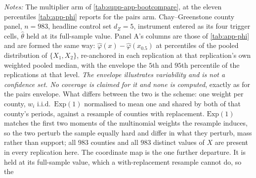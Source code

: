\documentclass[
  12pt]{article}
\newcommand{\1}[1]{\mathds{1}\left[#1\right]}
\theoremstyle{plain}
\theoremstyle{definition}
\theoremstyle{definition}
\theoremstyle{remark}
\begin{document}
\begin{landscape}
\begingroup
\singlespacing
{}
\label{tab:supp-app-phimult}
\scriptsize
\setlength{\tabcolsep}{4pt}
\let\tabular\longtable
\let\endtabular\endlongtable

\addtocounter{table}{-1}
\endgroup
\begingroup\singlespacing\footnotesize
\noindent\textit{Notes:} The multiplier arm of \cref{tab:supp-app-bootcompare}, at
the eleven percentiles \cref{tab:app-phi} reports for the pairs arm.
Chay--Greenstone county panel, $n=983$, headline control set $d_Z=5$, instrument
entered as its four trigger cells, $\hat\theta$ held at its full-sample value.
Panel A's columns are those of \cref{tab:app-phi} and are formed the same
way: $\hat\varphi(x)-\hat\varphi(x_{0.5})$ at percentiles of the pooled
distribution of $\{X_1,X_2\}$, re-anchored in each replication at that
replication's own weighted pooled median, with the envelope the $5$th and $95$th
percentile of the replications at that level. \emph{The envelope illustrates
variability and is not a confidence set. No coverage is claimed for it and none
is computed}, exactly as for the pairs envelope. What differs between the two is
the scheme: one weight per county, $w_i$ i.i.d.\ $\mathrm{Exp}(1)$ normalised to
mean one and shared by both of that county's periods, against a resample of
counties with replacement. $\mathrm{Exp}(1)$ matches the first two moments of the
multinomial weights the resample induces, so the two perturb the sample equally
hard and differ in what they perturb, mass rather than support; all $983$
counties and all $983$ distinct values of $X$ are present in every replication
here. The coordinate map is the one further departure. It is held at its
full-sample value, which a with-replacement resample cannot do, so the

\end{landscape}
\end{document}
